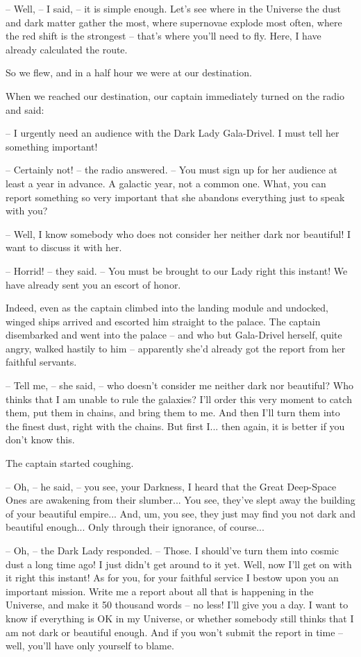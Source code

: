 \documentclass[ebook,twoside,final,openright]{memoir}
\begin{document}
– Well, – I said, – it is simple enough. Let's see where in the Universe the dust and dark matter gather the most, where supernovae explode most often, where the red shift is the strongest – that’s where you’ll need to fly. Here, I have already calculated the route.\par
So we flew, and in a half hour we were at our destination.\par
\par
When we reached our destination, our captain immediately turned on the radio and said:\par
– I urgently need an audience with the Dark Lady Gala-Drivel. I must tell her something important! \par
– Certainly not! – the radio answered. – You must sign up for her audience at least a year in advance. A galactic year, not a common one. What, you can report something so very important that she abandons everything just to speak with you?\par
– Well, I know somebody who does not consider her neither dark nor beautiful! I want to discuss it with her.\par
– Horrid! – they said. – You must be brought to our Lady right this instant! We have already sent you an escort of honor.\par
\par
Indeed, even as the captain climbed into the landing module and undocked, winged ships arrived and escorted him straight to the palace. The captain disembarked and went into the palace – and who but Gala-Drivel herself, quite angry, walked hastily to him – apparently she’d already got the report from her faithful servants.\par
– Tell me, – she said, – who doesn’t consider me neither dark nor beautiful? Who thinks that I am unable to rule the galaxies? I’ll order this very moment to catch them, put them in chains, and bring them to me. And then I’ll turn them into the finest dust, right with the chains. But first I... then again, it is better if you don’t know this.\par
The captain started coughing.\par
– Oh, – he said, – you see, your Darkness, I heard that the Great Deep-Space Ones are awakening from their slumber... You see, they’ve slept away the building of your beautiful empire... And, um, you see, they just may find you not dark and beautiful enough... Only through their ignorance, of course...\par
– Oh, – the Dark Lady responded. – Those. I should’ve turn them into cosmic dust a long time ago! I just didn’t get around to it yet. Well, now I’ll get on with it right this instant! As for you, for your faithful service I bestow upon you an important mission. Write me a report about all that is happening in the Universe, and make it 50 thousand words – no less! I’ll give you a day. I want to know if everything is OK in my Universe, or whether somebody still thinks that I am not dark or beautiful enough. And if you won’t submit the report in time – well, you’ll have only yourself to blame.\par
\end{document}
